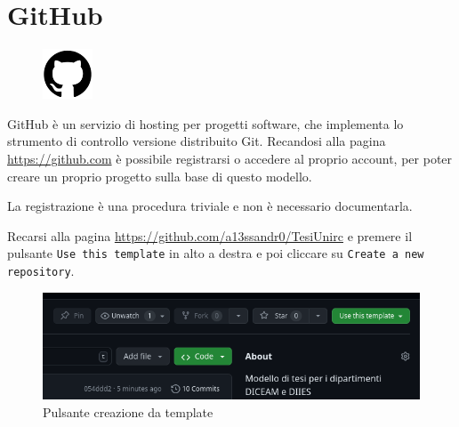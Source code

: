 \documentclass[envcountsame,envcountchap]{svmono}
\begin{document}
\section{GitHub}
\label{wrapfigure}
\begin{figure}
    \centering
    \vspace{-0.5\linewidth} %
    \includegraphics[width=\linewidth]{images/github/github.png}
    \vspace{-0.9\linewidth} %
    \label{logo_github}
\end{figure}

GitHub è un servizio di hosting per progetti software, che implementa lo strumento 
di controllo versione distribuito Git.
Recandosi alla pagina \url{https://github.com} è possibile registrarsi o accedere al 
proprio account, per poter creare un proprio progetto sulla base di questo modello.

La registrazione è una procedura triviale e non è necessario documentarla.

Recarsi alla pagina \url{https://github.com/a13ssandr0/TesiUnirc} e premere il pulsante 
{\tt Use this template} in alto a destra e poi cliccare su {\tt Create a new repository}.
\begin{figure}[H]
    \centering
    \includegraphics[width=\linewidth]{images/github/template.png}
    \caption{Pulsante creazione da template}
    \label{pulsante_creazione_repository}
\end{figure}
\end{document}

